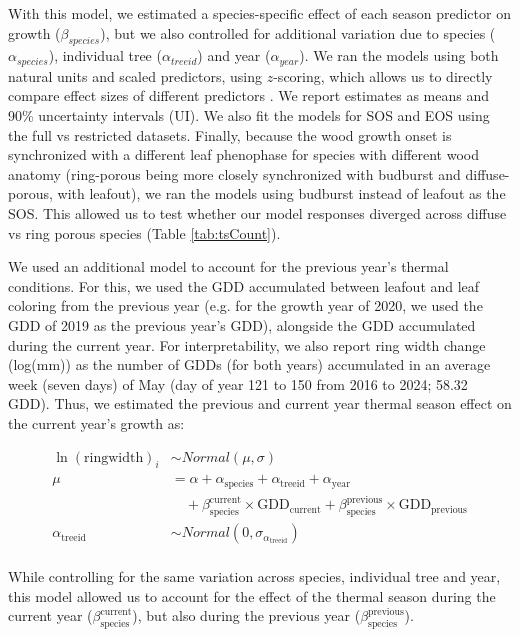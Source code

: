 \documentclass{article}\usepackage[]{graphicx}\usepackage[]{xcolor}
\begin{document}
With this model, we estimated a species-specific effect of each season predictor on growth ($\beta_{species}$), but we also controlled for additional variation due to species ($\alpha_{species}$), individual tree ($\alpha_{treeid}$) and year ($\alpha_{year}$). We ran the models using both natural units and scaled predictors, using $z$-scoring, which allows us to directly compare effect sizes of different predictors \citep{gelman_data_2006}. We report estimates as means and 90\% uncertainty intervals (UI). We also fit the models for SOS and EOS using the full vs restricted datasets. Finally, because the wood growth onset is synchronized with a different leaf phenophase for species with different wood anatomy (ring-porous being more closely synchronized with budburst and diffuse-porous, with leafout), we ran the models using budburst instead of leafout as the SOS. This allowed us to test whether our model responses diverged across diffuse vs ring porous species (Table \ref{tab:tsCount}). 

We used an additional model to account for the previous year's thermal conditions. For this, we used the GDD accumulated between leafout and leaf coloring from the previous year (e.g. for the growth year of 2020, we used the GDD of 2019 as the previous year's GDD), alongside the GDD accumulated during the current year. For interpretability, we also report ring width change (log(mm)) as the number of GDDs (for both years) accumulated in an average week (seven days) of May (day of year 121 to 150 from 2016 to 2024; 58.32 GDD). Thus, we estimated the previous and current year thermal season effect on the current year's growth as:

\begin{equation}
\begin{aligned} 
\ln(\text{ringwidth})_i &\sim Normal(\mu, \sigma) \\
\mu &= \alpha + \alpha_{\text{species}} + \alpha_{\text{treeid}} + \alpha_{\text{year}} \\
    &\quad + \beta_{\text{species}}^{\text{current}} \times \text{GDD}_{\text{current}}
           + \beta_{\text{species}}^{\text{previous}} \times \text{GDD}_{\text{previous}} \\
\alpha_{\text{treeid}} &\sim Normal(0, \sigma_{\alpha_{\text{treeid}}}) \\
\end{aligned}
\label{eq:prvsYrMdl}
\end{equation}

While controlling for the same variation across species, individual tree and year, this model allowed us to account for the effect of the thermal season during the current year ($\beta_{\text{species}}^{\text{current}}$), but also during the previous year ($\beta_{\text{species}}^{\text{previous}}$). 
\end{document}
